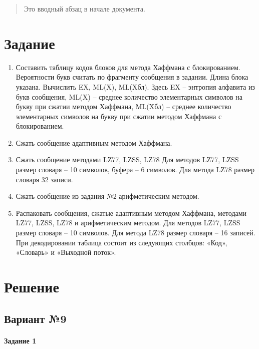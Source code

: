 \documentclass[a4paper, 12pt]{article}
\begin{document}
 
\tableofcontents

\begin{abstract}
  Это вводный абзац в начале документа.
\end{abstract}
 
\section{Задание}
\begin{enumerate}
\item Составить таблицу кодов блоков для метода Хаффмана с блокированием. Вероятности букв считать по фрагменту сообщения в задании. Длина блока указана. Вычислить EX, ML(X), ML(Xбл). Здесь EX – энтропия алфавита из букв сообщения, ML(X) – среднее количество элементарных символов на букву при сжатии методом Хаффмана, ML(Xбл) – среднее количество элементарных символов на букву при сжатии методом Хаффмана с блокированием. 
\item Сжать сообщение адаптивным методом Хаффмана. 
\item Сжать сообщение методами LZ77, LZSS, LZ78  Для методов LZ77, LZSS размер словаря – 10 символов, буфера – 6 символов. Для метода LZ78 размер словаря 32 записи. 
\item Сжать сообщение из задания №2 арифметическим методом. 
\item Распаковать сообщения, сжатые адаптивным методом Хаффмана, методами LZ77, LZSS, LZ78 и арифметическим методом. Для методов LZ77, LZSS размер словаря – 10 символов. Для метода LZ78 размер словаря – 16 записей. При декодировании таблица состоит из следующих столбцов: «Код», «Словарь» и «Выходной поток».
\end{enumerate}
\pagebreak
\section{Решение}
\subsection{Вариант №9}
\paragraph{Задание 1}
\end{document}
